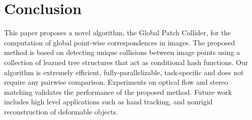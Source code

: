 \documentclass[10pt,twocolumn,letterpaper]{article}
\begin{document}
\section{Conclusion}
This paper proposes a novel algorithm, the Global Patch Collider, for the computation of global point-wise correspondences in images. The proposed method is based on detecting unique collisions between image points using a collection of learned tree structures that act as conditional
hash functions. Our algorithm is extremely efficient, fully-parallelizable, task-specific and does not require any pairwise comparison. Experiments on optical flow and stereo matching validates the performance of the proposed method. Future work includes high level applications such as hand tracking, and nonrigid reconstruction of deformable objects.
{\small

} 
\end{document}
